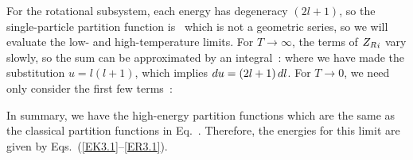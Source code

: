 {	For the rotational subsystem, each energy has degeneracy $(2l + 1)$, so the single-particle partition function is~\cite[p.~160]{Kardar}
	which is not a geometric series, so we will evaluate the low- and high-temperature limits.  For $T \to \infty$, the terms of ${Z_R}_i$ vary slowly, so the sum can be approximated by an integral~\cite[p.~160]{Kardar}:
	where we have made the substitution $u = l (l + 1)$, which implies $\dd{u} = (2l + 1)\dd{l}$.  For $T \to 0$, we need only consider the first few terms~\cite[p.~161]{Kardar}:
	
	In summary, we have the high-energy partition functions
	which are the same as the classical partition functions in Eq.~.  Therefore, the energies for this limit are given by Eqs.~(\ref{EK3.1}--\ref{ER3.1}).
	
}

